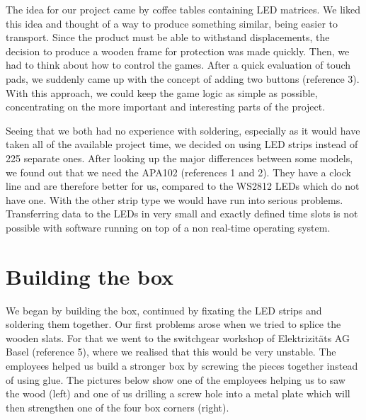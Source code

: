 \documentclass[a4paper,12pt]{article}
\begin{document}
 The idea for our project came by coffee tables containing LED matrices.
 We liked this idea and thought of a way to produce something similar, being easier to transport.
 Since the product must be able to withstand displacements, the decision to produce a wooden frame for protection was made quickly.
 Then, we had to think about how to control the games.
 After a quick evaluation of touch pads, we suddenly came up with the concept of adding two buttons (reference 3).
 With this approach, we could keep the game logic as simple as possible, concentrating on the more important and interesting parts of the project.
 
 Seeing that we both had no experience with soldering, especially as it would have taken all of the available project time, we decided on using LED strips instead of 225 separate ones.
 After looking up the major differences between some models, we found out that we need the APA102 (references 1 and 2).
 They have a clock line and are therefore better for us, compared to the WS2812 LEDs which do not have one.
 With the other strip type we would have run into serious problems.
 Transferring data to the LEDs in very small and exactly defined time slots is not possible with software running on top of a non real-time operating system.

\section{Building the box}
 We began by building the box, continued by fixating the LED strips and soldering them together.
 Our first problems arose when we tried to splice the wooden slats.
 For that we went to the switchgear workshop of Elektrizitäts AG Basel (reference 5), where we realised that this would be very unstable.
 The employees helped us build a stronger box by screwing the pieces together instead of using glue.
 The pictures below show one of the employees helping us to saw the wood (left) and one of us drilling a screw hole into a metal plate which will then strengthen one of the four box corners (right).
 
\vspace{1cm}
\end{document}
